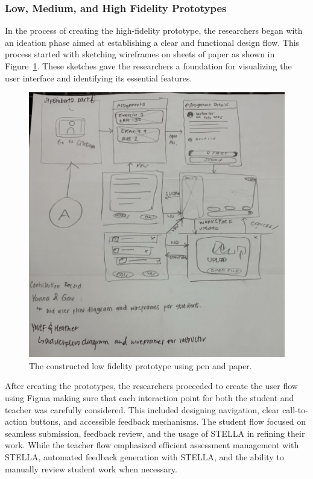 \documentclass[sigconf,natbib=true]{acmart}
\begin{document}
\subsubsection{Low, Medium, and High Fidelity Prototypes}
In the process of creating the high-fidelity prototype, the researchers began with an ideation phase aimed at establishing a clear and functional design flow. This process started with sketching wireframes on sheets of paper as shown in Figure~\ref{fig:lowfidelity}. These sketches gave the researchers a foundation for visualizing the user interface and identifying its essential features.

\begin{figure}[h]
  \centering
  \includegraphics[width=\linewidth]{low_fidelity.png}
  \caption{The constructed low fidelity prototype using pen and paper.}\label{fig:lowfidelity}
\end{figure}

After creating the prototypes, the researchers proceeded to create the user flow using Figma making sure that each interaction point for both the student and teacher was carefully considered. This included designing navigation, clear call-to-action buttons, and accessible feedback mechanisms. The student flow focused on seamless submission, feedback review, and the usage of STELLA in refining their work. While the teacher flow emphasized efficient assessment management with STELLA, automated feedback generation with STELLA, and the ability to manually review student work when necessary.
\end{document}
